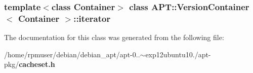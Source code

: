 \subsubsection*{template$<$class \-Container$>$ class A\-P\-T\-::\-Version\-Container$<$ Container $>$\-::iterator}



\-The documentation for this class was generated from the following file\-:\begin{DoxyCompactItemize}
\item 
/home/rpmuser/debian/debian\-\_\-apt/apt-\/0..$\sim$exp12ubuntu10./apt-\/pkg/{\bf cacheset.\-h}\end{DoxyCompactItemize}
